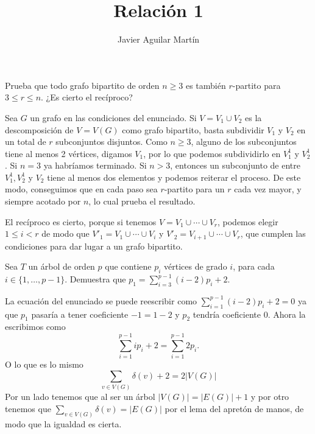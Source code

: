 \documentclass[twoside]{article}
\begin{document}
\title{Relación 1}
\author{Javier Aguilar Martín}
\maketitle


\begin{ejercicio}{1.1}
Prueba que todo grafo bipartito de orden $n \geq 3$ es también $r$-partito para $3\leq r \leq n$. ¿Es
cierto el recíproco?
\end{ejercicio}
\begin{solucion}
Sea $G$ un grafo en las condiciones del enunciado. Si $V=V_1\cup V_2$ es la descomposición de $V=V(G)$ como grafo bipartito, basta subdividir $V_1$ y $V_2$ en un total de $r$ subconjuntos disjuntos. Como $n\geq 3$, alguno de los subconjuntos tiene al menos 2 vértices, digamos $V_1$, por lo que podemos subdividirlo en $V_1^1$ y $V_2^1$. Si $n=3$ ya habríamos terminado. Si $n>3$, entonces un subconjunto de entre $V_1^1, V_2^1$ y $V_2$ tiene al menos dos elementos y podemos reiterar el proceso. De este modo, conseguimos que en cada paso sea $r$-partito para un $r$ cada vez mayor, y siempre acotado por $n$, lo cual prueba el resultado. 

El recíproco es cierto, porque si tenemos $V=V_1\cup\cdots\cup V_r$, podemos elegir $1\leq i< r$ de modo que $V'_1=V_1\cup\cdots\cup V_i$ y $V'_2=V_{i+1}\cup\cdots\cup V_r$, que cumplen las condiciones para dar lugar a un grafo bipartito. 
\end{solucion}

\newpage


\begin{ejercicio}{1.2}
Sea $T$ un árbol de orden $p$ que contiene $p_i$ vértices de grado $i$, para cada $i \in\{1,\dots, p-1\}$. Demuestra que $p_1 =
\sum^{p-1}_{i=3} (i - 2)p_i + 2$.
\end{ejercicio}
\begin{solucion}
La ecuación del enunciado se puede reescribir como $\sum_{i=1}^{p-1}(i-2)p_i+2=0$ ya que $p_1$ pasaría a tener coeficiente $-1=1-2$ y $p_2$ tendría coeficiente 0. Ahora la escribimos como
\[
\sum_{i=1}^{p-1} i p_i + 2 = \sum_{i=1}^{p-1}2p_i.
\]
O lo que es lo mismo
\[
\sum_{v\in V(G)}\delta(v)+2=2|V(G)|
\]
Por un lado tenemos que al ser un árbol $|V(G)|=|E(G)|+1$ y por otro tenemos que $\sum_{v\in V(G)}\delta(v)=|E(G)|$ por el lema del apretón de manos, de modo que la igualdad es cierta. 
\end{solucion}
\end{document}
